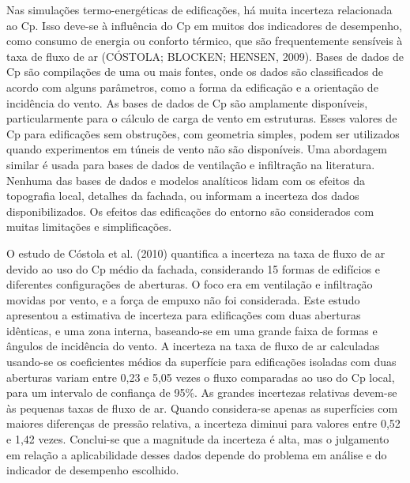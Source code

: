 \documentclass[brazil,hardcopy,openany,a5paper]{ufscthesis}
\begin{document}
	Nas simulações termo-energéticas de edificações, há muita incerteza relacionada ao Cp. Isso deve-se à influência do Cp em muitos dos indicadores de desempenho, como consumo de energia ou conforto térmico, que são frequentemente sensíveis à taxa de fluxo de ar (CÓSTOLA; BLOCKEN; HENSEN, 2009). Bases de dados de Cp são compilações de uma ou mais fontes, onde os dados são classificados de acordo com alguns parâmetros, como a forma da edificação e a orientação de incidência do vento. As bases de dados de Cp são amplamente disponíveis, particularmente para o cálculo de carga de vento em estruturas. Esses valores de Cp para edificações sem obstruções, com geometria simples, podem ser utilizados quando experimentos em túneis de vento não são disponíveis. Uma abordagem similar é usada para bases de dados de ventilação e infiltração na literatura. Nenhuma das bases de dados e modelos analíticos lidam com os efeitos da topografia local, detalhes da fachada, ou informam a incerteza dos dados disponibilizados. Os efeitos das edificações do entorno são considerados com muitas limitações e simplificações.
	
	O estudo de Cóstola et al. (2010) quantifica a incerteza na taxa de fluxo de ar devido ao uso do Cp médio da fachada, considerando 15 formas de edifícios e diferentes configurações de aberturas. O foco era em ventilação e infiltração movidas por vento, e a força de empuxo não foi considerada. Este estudo apresentou a estimativa de incerteza para edificações com duas aberturas idênticas, e uma zona interna, baseando-se em uma grande faixa de formas e ângulos de incidência do vento. A incerteza na taxa de fluxo de ar calculadas usando-se os coeficientes médios da superfície para edificações isoladas com duas aberturas variam entre 0,23 e 5,05 vezes o fluxo comparadas ao uso do Cp local, para um intervalo de confiança de 95\%. As grandes incertezas relativas devem-se às pequenas taxas de fluxo de ar. Quando considera-se apenas as superfícies com maiores diferenças de pressão relativa, a incerteza diminui para  valores entre 0,52 e 1,42 vezes. Conclui-se que a magnitude da incerteza é alta, mas o julgamento em relação a aplicabilidade desses dados depende do problema em análise e do indicador de desempenho escolhido.
	
\end{document}
